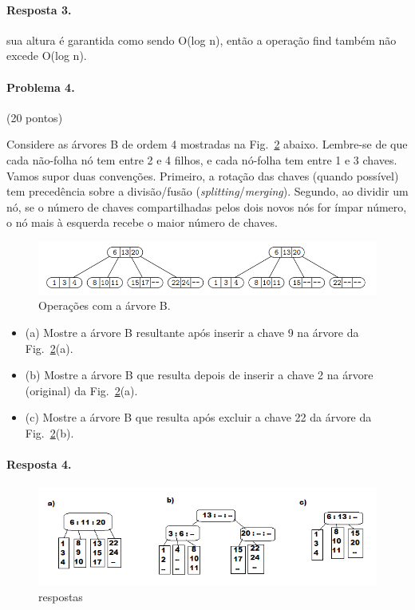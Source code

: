 \documentclass{article}
\begin{document}
\paragraph{Resposta 3.} sua altura é garantida como sendo O(log n), então a operação find também não excede O(log n).

\paragraph{Problema 4.} (20 pontos)

Considere as árvores B de ordem 4 mostradas na Fig.~\ref{fig:prob4} abaixo. Lembre-se de que cada não-folha
nó tem entre 2 e 4 filhos, e cada nó-folha tem entre 1 e 3 chaves. Vamos supor
duas convenções. Primeiro, a rotação das chaves (quando possível) tem precedência sobre a divisão/fusão (\textit{splitting}/\textit{merging}).
Segundo, ao dividir um nó, se o número de chaves compartilhadas pelos dois novos nós for ímpar
número, o nó mais à esquerda recebe o maior número de chaves.

\begin{figure}[h]
    \centering
    \includegraphics[width = 0.8\linewidth]{fig1.png}
    \caption{Operações com a árvore B.}
    \label{fig:prob4}
\end{figure}

\begin{itemize}
    \item (a) Mostre a árvore B resultante após inserir a chave 9 na árvore da Fig.~\ref{fig:prob4}(a).
\item (b) Mostre a árvore B que resulta depois de inserir a chave 2 na árvore (original) da Fig.~\ref{fig:prob4}(a).
\item (c) Mostre a árvore B que resulta após excluir a chave 22 da árvore da Fig.~\ref{fig:prob4}(b).
\end{itemize}

\paragraph{Resposta 4.}

 \begin{figure}[h]
    \centering
    \includegraphics[width = 0.8\linewidth]{fig2.png}
    \caption{respostas}
    \label{fig:prob4}
\end{figure}
\end{document}
